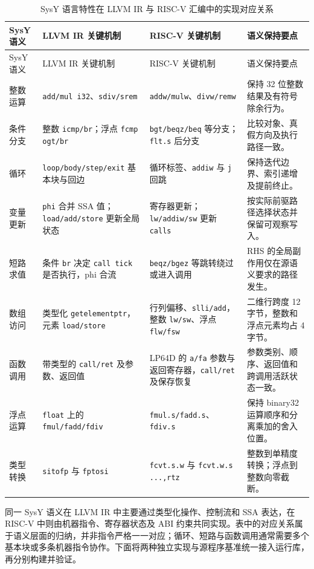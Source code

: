 \begingroup
\small
\setlength{\tabcolsep}{4pt}
\begin{longtable}{L{2.0cm}L{4.0cm}L{4.0cm}L{4.5cm}}
\caption{SysY 语言特性在 LLVM IR 与 RISC-V 汇编中的实现对应关系}
\label{tab:sysy-semantic-mapping}\\
\toprule{}SysY 语义 & LLVM IR 关键机制 & RISC-V 关键机制 & 语义保持要点 \\
\midrule
\endfirsthead
\toprule{}SysY 语义 & LLVM IR 关键机制 & RISC-V 关键机制 & 语义保持要点 \\
\midrule
\endhead
\bottomrule
\endfoot
整数运算 & \texttt{add/mul i32}、\texttt{sdiv/srem} & \texttt{addw/mulw}、\texttt{divw/remw} & 保持 32 位整数结果及有符号除余行为。\\
条件分支 & 整数 \texttt{icmp/br}；浮点 \texttt{fcmp ogt/br} & \texttt{bgt/beqz/beq} 等分支；\texttt{flt.s} 后分支 & 比较对象、真假方向及执行路径一致。\\
循环 & \texttt{loop/body/step/exit} 基本块与回边 & 循环标签、\texttt{addiw} 与 \texttt{j} 回跳 & 保持迭代边界、索引递增及提前终止。\\
变量更新 & \texttt{phi} 合并 SSA 值；\texttt{load/add/store} 更新全局状态 & 寄存器更新；\texttt{lw/addiw/sw} 更新 \texttt{calls} & 按实际前驱路径选择状态并保留可观察写入。\\
短路求值 & 条件 \texttt{br} 决定 \texttt{call tick} 是否执行，phi 合流 & \texttt{beqz/bgez} 等跳转绕过或进入调用 & RHS 的全局副作用仅在源语义要求的路径发生。\\
数组访问 & 类型化 \texttt{getelementptr}，元素 \texttt{load/store} & 行列偏移、\texttt{slli/add}，整数 \texttt{lw/sw}、浮点 \texttt{flw/fsw} & 二维行跨度 12 字节，整数和浮点元素均占 4 字节。\\
函数调用 & 带类型的 \texttt{call/ret} 及参数、返回值 & LP64D 的 \texttt{a/fa} 参数与返回寄存器，\texttt{call/ret} 及保存恢复 & 参数类别、顺序、返回值和跨调用活跃状态一致。\\
浮点运算 & \texttt{float} 上的 \texttt{fmul/fadd/fdiv} & \texttt{fmul.s/fadd.s}、\texttt{fdiv.s} & 保持 binary32 运算顺序和分离乘加的舍入位置。\\
类型转换 & \texttt{sitofp} 与 \texttt{fptosi} & \texttt{fcvt.s.w} 与 \texttt{fcvt.w.s ...,rtz} & 整数到单精度转换；浮点到整数向零截断。\\
\end{longtable}
\endgroup

同一 SysY 语义在 LLVM IR 中主要通过类型化操作、控制流和 SSA 表达，在 RISC-V 中则由机器指令、寄存器状态及 ABI 约束共同实现。表中的对应关系属于语义层面的归纳，并非指令严格一一对应；循环、短路与函数调用通常需要多个基本块或多条机器指令协作。下面将两种独立实现与源程序基准统一接入运行库，再分别构建并验证。


